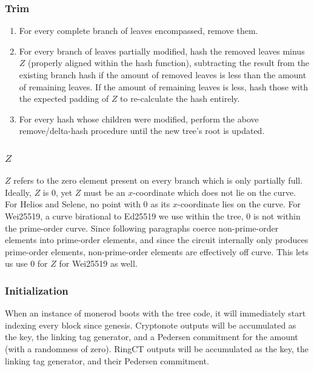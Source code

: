 \documentclass[]{article}
\begin{document}
\subsubsection{Trim}

\begin{enumerate}
  \item For every complete branch of leaves encompassed, remove them.
  \item For every branch of leaves partially modified, hash the removed leaves minus $Z$ (properly aligned within the hash function), subtracting the result from the existing branch hash if the amount of removed leaves is less than the amount of remaining leaves. If the amount of remaining leaves is less, hash those with the expected padding of $Z$ to re-calculate the hash entirely.
  \item For every hash whose children were modified, perform the above remove/delta-hash procedure until the new tree's root is updated.
\end{enumerate}

\subsubsection{$Z$}

$Z$ refers to the zero element present on every branch which is only partially full. Ideally, $Z$ is $0$, yet $Z$ must be an $x$-coordinate which does not lie on the curve. For Helios and Selene, no point with $0$ as its $x$-coordinate lies on the curve. For Wei25519, a curve birational to Ed25519 we use within the tree, $0$ is not within the prime-order curve. Since following paragraphs coerce non-prime-order elements into prime-order elements, and since the circuit internally only produces prime-order elements, non-prime-order elements are effectively off curve. This lets us use $0$ for $Z$ for Wei25519 as well.

\subsubsection{Initialization}

When an instance of monerod boots with the tree code, it will immediately start indexing every block since genesis. Cryptonote outputs will be accumulated as the key, the linking tag generator, and a Pedersen commitment for the amount (with a randomness of zero). RingCT outputs will be accumulated as the key, the linking tag generator, and their Pedersen commitment.
\end{document}
